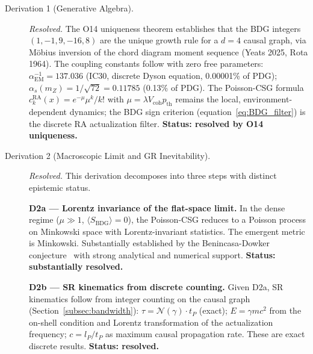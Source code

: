 \documentclass[11pt,a4paper]{article}
\theoremstyle{plain}
\theoremstyle{definition}
\theoremstyle{remark}
\begin{document}
\begin{description}
  \item[Derivation 1 (Generative Algebra).] \textit{Resolved.} The
  O14 uniqueness theorem establishes that the BDG integers
  $(1,-1,9,-16,8)$ are the unique growth rule for a $d=4$ causal
  graph, via M\"obius inversion of the chord diagram moment sequence
  (Yeats 2025, Rota 1964). The coupling constants follow with zero
  free parameters: $\alpha_{\mathrm{EM}}^{-1} = 137.036$ (IC30,
  discrete Dyson equation, 0.00001\% of PDG);
  $\alpha_s(m_Z) = 1/\sqrt{72} = 0.11785$ (0.13\% of PDG). The
  Poisson-CSG formula
  $c_k^{\mathrm{RA}}(x) = e^{-\mu}\mu^k/k!$ with $\mu = \lambda V_{\mathrm{coh}}
  p_{\mathrm{th}}$ remains the local, environment-dependent dynamics;
  the BDG sign criterion (equation~\eqref{eq:BDG_filter}) is the
  discrete RA actualization filter.
  \textbf{Status: resolved by O14 uniqueness.}

  \item[Derivation 2 (Macroscopic Limit and GR Inevitability).]
  \textit{Resolved.} This derivation decomposes
  into three steps with distinct epistemic status.

  \textbf{D2a --- Lorentz invariance of the flat-space limit.} In the dense
  regime ($\mu \gg 1$, $\langle S_{\mathrm{BDG}}\rangle = 0$), the Poisson-CSG
  reduces to a Poisson process on Minkowski space with Lorentz-invariant
  statistics. The emergent metric is Minkowski. Substantially established by
  the Benincasa-Dowker conjecture~\citep{Benincasa2010} with strong analytical
  and numerical support. \textbf{Status: substantially resolved.}

  \textbf{D2b --- SR kinematics from discrete counting.} Given D2a, SR
  kinematics follow from integer counting on the causal graph
  (Section~\ref{subsec:bandwidth}): $\tau = \mathcal{N}(\gamma)\cdot t_P$
  (exact); $E = \gamma mc^2$ from the on-shell condition and Lorentz
  transformation of the actualization frequency; $c = l_P/t_P$ as maximum
  causal propagation rate. These are exact discrete results.
  \textbf{Status: resolved.}


\end{description}
\end{document}
